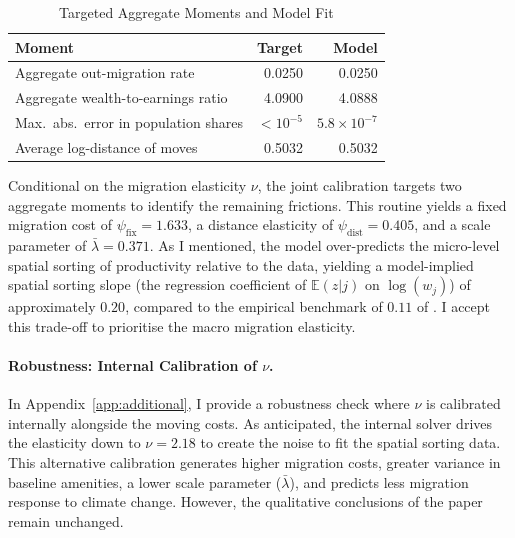 \documentclass[12pt, a4paper]{article}
\begin{document}
\begin{table}[htbp]
\centering
\caption{Targeted Aggregate Moments and Model Fit}
\label{tab:calibration_fit}
\begin{tabular}{lrr}
\toprule
Moment & Target & Model \\
\midrule
Aggregate out-migration rate & 0.0250 & 0.0250 \\
Aggregate wealth-to-earnings ratio & 4.0900 & 4.0888 \\
Max.\ abs.\ error in population shares & $<10^{-5}$ & $5.8 \times 10^{-7}$ \\
Average log-distance of moves & 0.5032 & 0.5032 \\ 
\bottomrule
\end{tabular}
\end{table}

Conditional on the migration elasticity $\nu$, the joint calibration targets two aggregate moments to identify the remaining frictions. This routine yields a fixed migration cost of $\psi_{\text{fix}} = 1.633$, a distance elasticity of $\psi_{\text{dist}} = 0.405$, and a scale parameter of $\bar{\lambda} = 0.371$. As I mentioned, the model over-predicts the micro-level spatial sorting of productivity relative to the data, yielding a model-implied spatial sorting slope (the regression coefficient of $\mathbb{E}(z|j)$ on $\log(w_j)$) of approximately $0.20$, compared to the empirical benchmark of $0.11$ of \citet{dvorkin_geography_2025}. I accept this trade-off to prioritise the macro migration elasticity.

\paragraph{Robustness: Internal Calibration of $\nu$.} 
In Appendix~\ref{app:additional}, I provide a robustness check where $\nu$ is calibrated internally alongside the moving costs. As anticipated, the internal solver drives the elasticity down to $\nu = 2.18$ to create the noise to fit the spatial sorting data. This alternative calibration generates higher migration costs, greater variance in baseline amenities, a lower scale parameter ($\bar{\lambda}$), and predicts less migration response to climate change. However, the qualitative conclusions of the paper remain unchanged.
\end{document}
